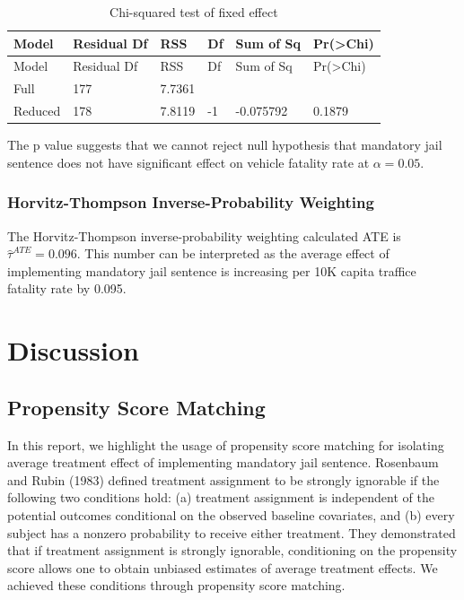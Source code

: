 \documentclass[]{article}
\begin{document}
\begin{longtable}[]{@{}llllll@{}}
\caption{\label{tab:chisq}Chi-squared test of fixed effect}\tabularnewline
\toprule
Model & Residual Df & RSS & Df & Sum of Sq & Pr(\textgreater{}Chi)\tabularnewline
\midrule
\endfirsthead
\toprule
Model & Residual Df & RSS & Df & Sum of Sq & Pr(\textgreater{}Chi)\tabularnewline
\midrule
\endhead
Full & 177 & 7.7361 & & &\tabularnewline
Reduced & 178 & 7.8119 & -1 & -0.075792 & 0.1879\tabularnewline
\bottomrule
\end{longtable}

The p value suggests that we cannot reject null hypothesis that mandatory jail sentence does not have significant effect on vehicle fatality rate at \(\alpha = 0.05\).

\hypertarget{horvitz-thompson-inverse-probability-weighting-1}{%
\subsubsection{Horvitz-Thompson Inverse-Probability Weighting}\label{horvitz-thompson-inverse-probability-weighting-1}}

The Horvitz-Thompson inverse-probability weighting calculated ATE is \(\hat{\tau}^{ATE} = 0.096\). This number can be interpreted as the average effect of implementing mandatory jail sentence is increasing per 10K capita traffice fatality rate by 0.095.

\hypertarget{discussion}{%
\section{Discussion}\label{discussion}}

\hypertarget{propensity-score-matching}{%
\subsection{Propensity Score Matching}\label{propensity-score-matching}}

In this report, we highlight the usage of propensity score matching for isolating average treatment effect of implementing mandatory jail sentence. Rosenbaum and Rubin (1983) defined treatment assignment to be strongly ignorable if the following two conditions hold: (a) treatment assignment is independent of the potential outcomes conditional on the observed baseline covariates, and (b) every subject has a nonzero probability to receive either treatment. They demonstrated that if treatment assignment is strongly ignorable, conditioning on the propensity score allows one to obtain unbiased estimates of average treatment effects. We achieved these conditions through propensity score matching.
\end{document}
